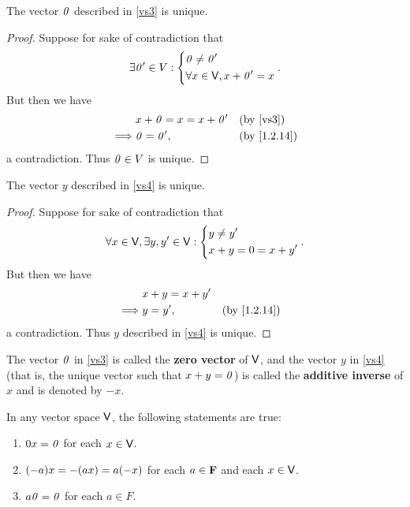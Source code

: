 \begin{cor}\label{1.2.15}
  The vector \(\mathit{0}\) described in \ref{vs3} is unique.
\end{cor}

\begin{proof}
  Suppose for sake of contradiction that
  \[
    \exists \mathit{0}' \in V : \begin{dcases}
      \mathit{0} \neq \mathit{0}' \\
      \forall x \in \mathsf{V}, x + \mathit{0}' = x
    \end{dcases}.
  \]
  But then we have
  \begin{align*}
             & x + \zv = x = x + \zv' &  & \text{(by \ref{vs3})}     \\
    \implies & \zv = \zv',            &  & \text{(by \cref{1.2.14})}
  \end{align*}
  a contradiction.
  Thus \(\mathit{0} \in V\) is unique.
\end{proof}

\begin{cor}\label{1.2.16}
  The vector \(y\) described in \ref{vs4} is unique.
\end{cor}

\begin{proof}
  Suppose for sake of contradiction that
  \[
    \forall x \in \mathsf{V}, \exists y, y' \in \mathsf{V} : \begin{dcases}
      y \neq y' \\
      x + y = 0 = x + y'
    \end{dcases}.
  \]
  But then we have
  \begin{align*}
             & x + y = x + y'                                \\
    \implies & y = y',        &  & \text{(by \cref{1.2.14})}
  \end{align*}
  a contradiction.
  Thus \(y\) described in \ref{vs4} is unique.
\end{proof}

\begin{defn}\label{1.2.17}
  The vector \(\mathit{0}\) in \ref{vs3} is called the \textbf{zero vector} of \(\mathsf{V}\), and the vector \(y\) in \ref{vs4} (that is, the unique vector such that \(x + y = \mathit{0}\)) is called the \textbf{additive inverse} of \(x\) and is denoted by \(-x\).
\end{defn}

\begin{thm}\label{1.2.18}
  In any vector space \(\mathsf{V}\), the following statements are true:
  \begin{enumerate}
    \item \(0x = \mathit{0}\) for each \(x \in \mathsf{V}\).
    \item \(\p{-a}x = -\p{ax} = a\p{-x}\) for each \(a \in \mathbf{F}\) and each \(x \in \mathsf{V}\).
    \item \(a\mathit{0} = \mathit{0}\) for each \(a \in F\).
  \end{enumerate}
\end{thm}

